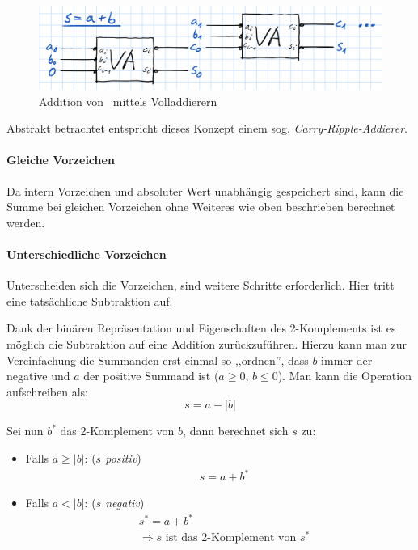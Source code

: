         \begin{figure}[H]
            \centering
            \includegraphics[width=0.7\linewidth]{images/fulladderchain}
            \caption{Addition von \mpi\ mittels Volladdierern}
            \label{fig:fulladderchain}
        \end{figure}

        Abstrakt betrachtet entspricht dieses Konzept einem sog. \emph{Carry-Ripple-Addierer}.

    \paragraph*{Gleiche Vorzeichen}
        Da intern Vorzeichen und absoluter Wert unabhängig gespeichert sind, kann die Summe bei gleichen Vorzeichen ohne Weiteres wie oben beschrieben berechnet werden.

    \paragraph*{Unterschiedliche Vorzeichen}
        Unterscheiden sich die Vorzeichen, sind weitere Schritte erforderlich. Hier tritt eine tatsächliche Subtraktion auf.


        Dank der binären Repräsentation und Eigenschaften des 2-Komplements ist es möglich die Subtraktion auf eine Addition zurückzuführen.
        Hierzu kann man zur Vereinfachung die Summanden erst einmal so ,,ordnen'', dass $b$ immer der negative und $a$ der positive Summand ist ($a \ge 0$, $b \le 0$). Man kann die Operation aufschreiben als:
        \begin{equation*}
        s = a - |b|
        \end{equation*}

        Sei nun $b^*$ das 2-Komplement von $b$, dann berechnet sich $s$ zu:

        \begin{itemize} \tightlist
            \item Falls $a \ge |b|$: (\emph{$s$ positiv})
                \begin{align*}
                    & s = a + b^*
                \end{align*}
            \item Falls $a < |b|$: (\emph{$s$ negativ})
                \begin{align*}
                    & s^* = a + b^* \\
                    & \Rightarrow s \text{ ist das 2-Komplement von } s^*
                \end{align*}
        \end{itemize}


